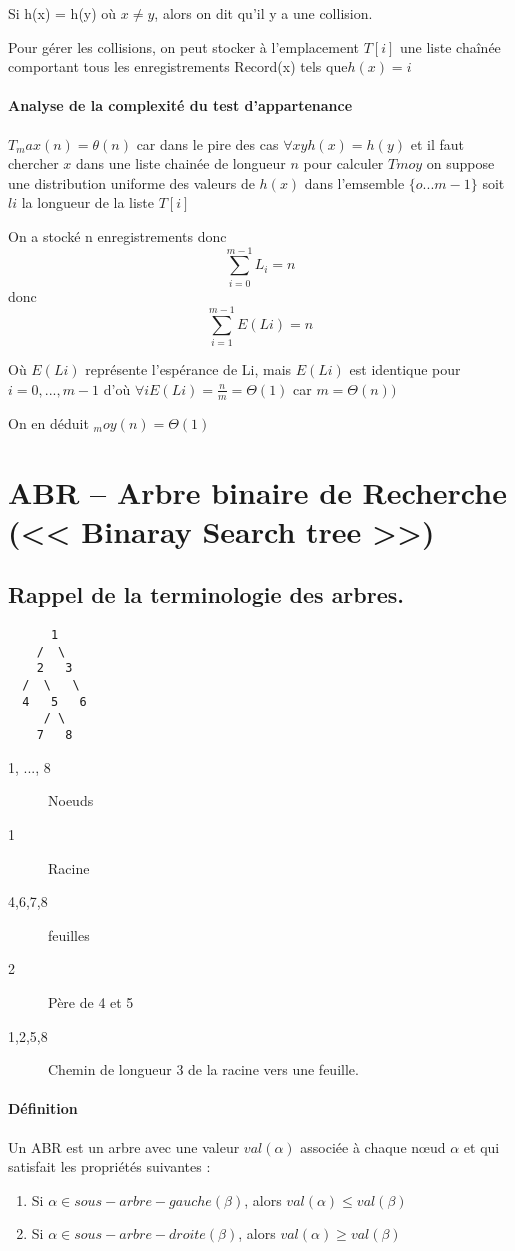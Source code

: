 Si h(x) = h(y) où $x\neq y$, alors on dit qu'il y a une collision.

Pour gérer les collisions, on peut stocker à l'emplacement $T[i]$ une liste chaînée comportant
tous les enregistrements Record(x) tels que$ h(x)=i$

\paragraph{Analyse de la complexité du test d'appartenance}
$T_max(n) = \theta(n)$ car dans le pire des cas $\forall x y h(x) = h(y)$ et il faut chercher
$x$ dans une liste chainée de longueur $n$ pour calculer $Tmoy$ on suppose une distribution
uniforme des valeurs de $h(x)$ dans l'emsemble $\{o... m-1\}$ soit $li$ la longueur de la
liste $T[i]$

On a stocké n enregistrements donc
$$ \sum^{m-1}_{i=0} L_i = n$$
donc $$\sum^{m-1}_{i=1} E(Li)  = n$$

Où $E(Li)$ représente l'espérance de Li, mais $E(Li)$ est identique pour $i = 0, ..., m-1$ d'où
$\forall i E(Li) = \frac{n}{m} = \Theta(1)$ car $m = \Theta(n))$

On en déduit $_moy (n) = \Theta (1)$

\section{ABR -- Arbre binaire de Recherche (<< Binaray Search tree >>)}
\subsection{Rappel de la terminologie des arbres.}
	\begin{verbatim}
      1
    /  \
    2   3
  /  \   \ 
  4   5   6
     / \
    7   8
	\end{verbatim}
    
    \begin{description}
    \item[1, ..., 8] Noeuds
     \item[1] Racine
     \item[4,6,7,8] feuilles
     \item[2] Père de 4 et 5
     \item[1,2,5,8] Chemin de longueur 3 de la racine vers une feuille.
    \end{description}
    \paragraph{Définition} Un ABR est un arbre avec une valeur $val(\alpha)$ associée à chaque
	nœud $\alpha$ et qui satisfait les propriétés suivantes : 
    \begin{enumerate}
    \item Si $\alpha \in sous-arbre-gauche(\beta)$, alors $val(\alpha) \leq val(\beta)$
    \item Si $\alpha \in sous-arbre-droite(\beta)$, alors $val(\alpha) \geq val(\beta)$
    \end{enumerate}
    
